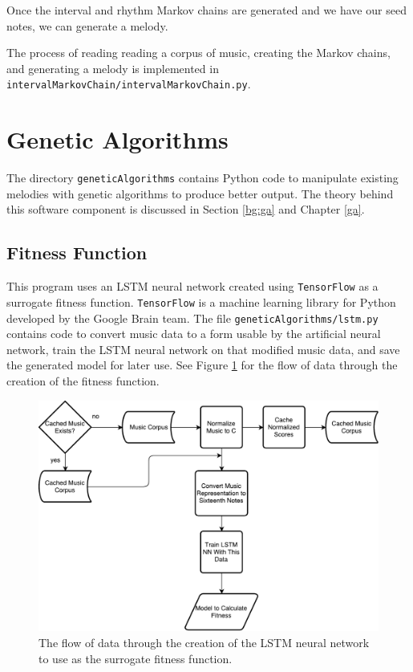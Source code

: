Once the interval and rhythm Markov chains are generated and we have our seed notes, we can generate a melody.

The process of reading reading a corpus of music, creating the Markov chains, and generating a melody is implemented in \texttt{intervalMarkovChain/intervalMarkovChain.py}.

\section{Genetic Algorithms} \label{software:ga}

The directory \texttt{geneticAlgorithms} contains Python code to manipulate existing melodies with genetic algorithms to produce better output.
The theory behind this software component is discussed in Section \ref{bg:ga} and Chapter \ref{ga}.

\subsection{Fitness Function} \label{software:ga:fitness}

This program uses an LSTM neural network created using \texttt{TensorFlow} as a surrogate fitness function.
\texttt{TensorFlow} is a machine learning library for Python developed by the Google Brain team.
The file \texttt{geneticAlgorithms/lstm.py} contains code to convert music data to a form usable by the artificial neural network, train the LSTM neural network on that modified music data, and save the generated model for later use.
See Figure \ref{fig:lstmflowchart} for the flow of data through the creation of the fitness function.

\begin{figure}[h!]
	\centering
	\includegraphics[width=\linewidth]{figures/lstm_flowchart.pdf}
	\caption{The flow of data through the creation of the LSTM neural network to use as the surrogate fitness function.}
	\label{fig:lstmflowchart}
\end{figure}


